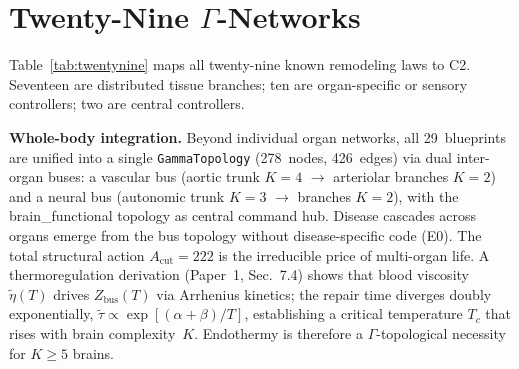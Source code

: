 \documentclass[aps,pre,twocolumn,superscriptaddress,floatfix]{revtex4-2}
\newcommand{\Acut}{A_{\text{cut}}}
\begin{document}
\section{Twenty-Nine $\Gamma$-Networks}
\label{sec:twentynine}

Table~\ref{tab:twentynine} maps all twenty-nine known
remodeling laws to C2.  Seventeen are distributed
tissue branches; ten are organ-specific or sensory
controllers; two are central controllers.

\textbf{Whole-body integration.}  Beyond individual organ
networks, all 29~blueprints are unified into a single
\texttt{GammaTopology} (278~nodes, 426~edges) via dual
inter-organ buses: a vascular bus (aortic trunk $K{=}4$
$\to$ arteriolar branches $K{=}2$) and a neural bus
(autonomic trunk $K{=}3$ $\to$ branches $K{=}2$), with
the brain\_functional topology as central command hub.
Disease cascades across organs emerge from the bus
topology without disease-specific code (E0).
The total structural action $\Acut = 222$ is the
irreducible price of multi-organ life.
A thermoregulation derivation (Paper~1, Sec.~7.4)
shows that blood viscosity $\tilde\eta(T)$ drives
$Z_{\text{bus}}(T)$ via Arrhenius kinetics;
the repair time diverges doubly exponentially,
$\tilde\tau \propto \exp[(\alpha+\beta)/T]$,
establishing a critical temperature $T_c$
that rises with brain complexity~$K$.
Endothermy is therefore a $\Gamma$-topological
necessity for $K \geq 5$ brains.
\end{document}
